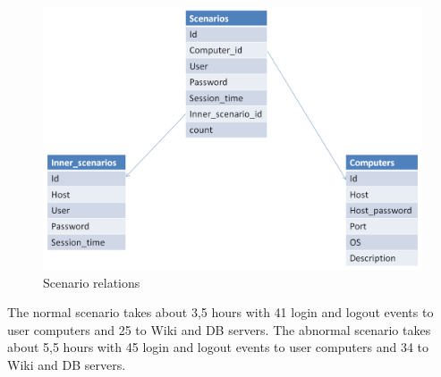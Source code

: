\begin{figure}[ht!]
\centering
\includegraphics[width=150mm]{scenario_relations.png}
\caption{Scenario relations}
\label{overflow}
\end{figure}


The normal scenario takes about 3,5 hours with 41 login and logout events to user computers and 25 to Wiki and DB servers. The abnormal scenario takes about 5,5 hours with 45 login and logout events to user computers and 34 to Wiki and DB servers.
 
% 